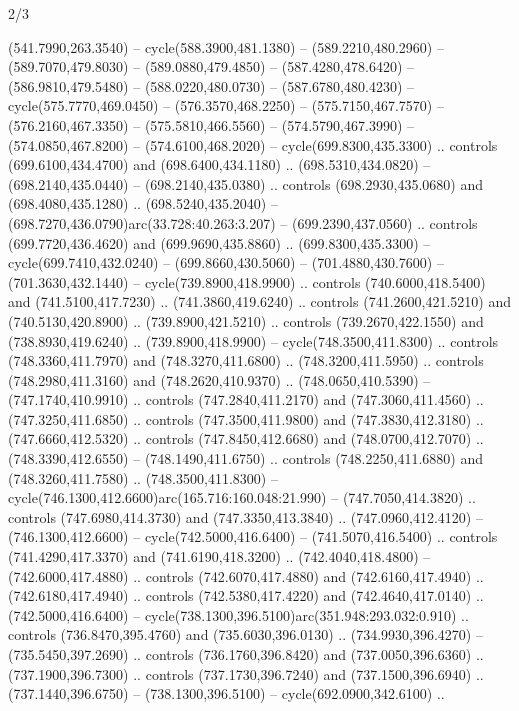 \begin{flagdescription}{2/3}
\begin{scope}[xshift=0.5\flaglength,yshift=0.5\flagwidth,scale=\flagwidth/638.38]
\begin{scope}[y=0.80pt, x=0.80pt, yscale=-1,shift={(-600,-400)}]
\begin{scope}[shift={(-0.02,2.173)}]
  (541.7990,263.3540) -- cycle(588.3900,481.1380) -- (589.2210,480.2960) --
  (589.7070,479.8030) -- (589.0880,479.4850) -- (587.4280,478.6420) --
  (586.9810,479.5480) -- (588.0220,480.0730) -- (587.6780,480.4230) --
  cycle(575.7770,469.0450) -- (576.3570,468.2250) -- (575.7150,467.7570) --
  (576.2160,467.3350) -- (575.5810,466.5560) -- (574.5790,467.3990) --
  (574.0850,467.8200) -- (574.6100,468.2020) -- cycle(699.8300,435.3300) ..
  controls (699.6100,434.4700) and (698.6400,434.1180) .. (698.5310,434.0820) --
  (698.2140,435.0440) -- (698.2140,435.0380) .. controls (698.2930,435.0680) and
  (698.4080,435.1280) .. (698.5240,435.2040) --
  (698.7270,436.0790)arc(33.728:40.263:3.207) -- (699.2390,437.0560) .. controls
  (699.7720,436.4620) and (699.9690,435.8860) .. (699.8300,435.3300) --
  cycle(699.7410,432.0240) -- (699.8660,430.5060) -- (701.4880,430.7600) --
  (701.3630,432.1440) -- cycle(739.8900,418.9900) .. controls
  (740.6000,418.5400) and (741.5100,417.7230) .. (741.3860,419.6240) .. controls
  (741.2600,421.5210) and (740.5130,420.8900) .. (739.8900,421.5210) .. controls
  (739.2670,422.1550) and (738.8930,419.6240) .. (739.8900,418.9900) --
  cycle(748.3500,411.8300) .. controls (748.3360,411.7970) and
  (748.3270,411.6800) .. (748.3200,411.5950) .. controls (748.2980,411.3160) and
  (748.2620,410.9370) .. (748.0650,410.5390) -- (747.1740,410.9910) .. controls
  (747.2840,411.2170) and (747.3060,411.4560) .. (747.3250,411.6850) .. controls
  (747.3500,411.9800) and (747.3830,412.3180) .. (747.6660,412.5320) .. controls
  (747.8450,412.6680) and (748.0700,412.7070) .. (748.3390,412.6550) --
  (748.1490,411.6750) .. controls (748.2250,411.6880) and (748.3260,411.7580) ..
  (748.3500,411.8300) -- cycle(746.1300,412.6600)arc(165.716:160.048:21.990) --
  (747.7050,414.3820) .. controls (747.6980,414.3730) and (747.3350,413.3840) ..
  (747.0960,412.4120) -- (746.1300,412.6600) -- cycle(742.5000,416.6400) --
  (741.5070,416.5400) .. controls (741.4290,417.3370) and (741.6190,418.3200) ..
  (742.4040,418.4800) -- (742.6000,417.4880) .. controls (742.6070,417.4880) and
  (742.6160,417.4940) .. (742.6180,417.4940) .. controls (742.5380,417.4220) and
  (742.4640,417.0140) .. (742.5000,416.6400) --
  cycle(738.1300,396.5100)arc(351.948:293.032:0.910) .. controls
  (736.8470,395.4760) and (735.6030,396.0130) .. (734.9930,396.4270) --
  (735.5450,397.2690) .. controls (736.1760,396.8420) and (737.0050,396.6360) ..
  (737.1900,396.7300) .. controls (737.1730,396.7240) and (737.1500,396.6940) ..
  (737.1440,396.6750) -- (738.1300,396.5100) -- cycle(692.0900,342.6100) ..

\end{scope}
\end{scope}
\end{scope}
\end{flagdescription}

